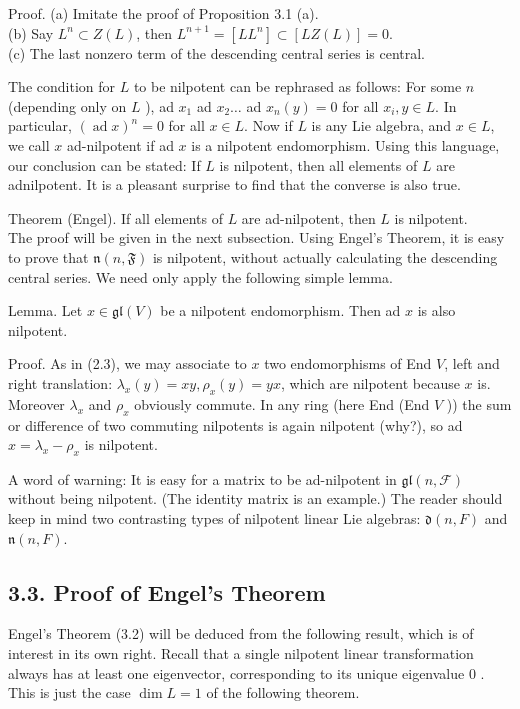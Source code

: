 \documentclass[10pt]{article}
\begin{document}
Proof. (a) Imitate the proof of Proposition 3.1 (a).\\
(b) Say $L^{n} \subset Z(L)$, then $L^{n+1}=\left[L L^{n}\right] \subset[L Z(L)]=0$.\\
(c) The last nonzero term of the descending central series is central.

The condition for $L$ to be nilpotent can be rephrased as follows: For some $n$ (depending only on $L$ ), ad $x_{1}$ ad $x_{2} \ldots$ ad $x_{n}(y)=0$ for all $x_{i}, y \in L$. In particular, $(\operatorname{ad} x)^{n}=0$ for all $x \in L$. Now if $L$ is any Lie algebra, and $x \in L$, we call $x$ ad-nilpotent if ad $x$ is a nilpotent endomorphism. Using this language, our conclusion can be stated: If $L$ is nilpotent, then all elements of $L$ are adnilpotent. It is a pleasant surprise to find that the converse is also true.

Theorem (Engel). If all elements of $L$ are ad-nilpotent, then $L$ is nilpotent.\\
The proof will be given in the next subsection. Using Engel's Theorem, it is easy to prove that $\mathfrak{n}(n, \mathfrak{F})$ is nilpotent, without actually calculating the descending central series. We need only apply the following simple lemma.

Lemma. Let $x \in \mathfrak{g l}(V)$ be a nilpotent endomorphism. Then ad $x$ is also nilpotent.

Proof. As in (2.3), we may associate to $x$ two endomorphisms of End $V$, left and right translation: $\lambda_{x}(y)=x y, \rho_{x}(y)=y x$, which are nilpotent because $x$ is. Moreover $\lambda_{x}$ and $\rho_{x}$ obviously commute. In any ring (here End (End $V$ )) the sum or difference of two commuting nilpotents is again nilpotent (why?), so ad $x=\lambda_{x}-\rho_{x}$ is nilpotent.

A word of warning: It is easy for a matrix to be ad-nilpotent in $\mathfrak{g l}(n, \mathcal{F})$ without being nilpotent. (The identity matrix is an example.) The reader should keep in mind two contrasting types of nilpotent linear Lie algebras: $\mathfrak{d}(n, F)$ and $\mathfrak{n}(n, F)$.

\subsection*{3.3. Proof of Engel's Theorem}
Engel's Theorem (3.2) will be deduced from the following result, which is of interest in its own right. Recall that a single nilpotent linear transformation always has at least one eigenvector, corresponding to its unique eigenvalue 0 . This is just the case $\operatorname{dim} L=1$ of the following theorem.
\end{document}
